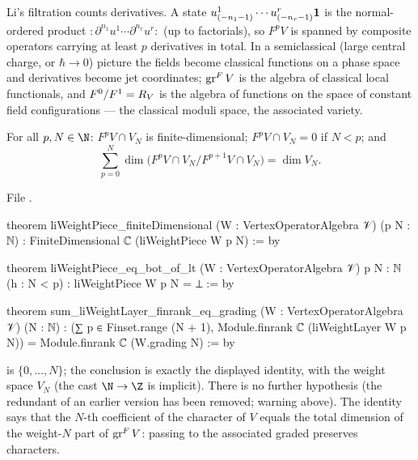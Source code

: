 \begin{physics}
Li's filtration counts derivatives. A state $u^1_{(-n_1-1)}\cdots u^r_{(-n_r-1)}\mathbf{1}$ is the
normal-ordered product ${:}\partial^{n_1}u^1\cdots\partial^{n_r}u^r{:}$ (up to factorials), so $F^pV$ is
spanned by composite operators carrying at least $p$ derivatives in total. In a semiclassical (large
central charge, or $\hbar\to0$) picture the fields become classical functions on a phase space and
derivatives become jet coordinates; $\operatorname{gr}^FV$ is the algebra of classical local functionals, and
$F^0/F^1 = R_V$ is the algebra of functions on the space of constant field configurations --- the
classical moduli space, the associated variety.
\end{physics}

\begin{theorem}\label{l11:thm:litele}
For all $p,N\in\N$: $F^pV\cap V_N$ is finite-dimensional; $F^pV\cap V_N = 0$ if $N<p$; and
\begin{equation*}
\sum_{p=0}^{N}\dim\bigl(F^pV\cap V_N\big/F^{p+1}V\cap V_N\bigr) = \dim V_N .
\end{equation*}
\end{theorem}
\noindent File .
\begin{leancode}
theorem liWeightPiece_finiteDimensional (W : VertexOperatorAlgebra 𝒱) (p N : ℕ) :
    FiniteDimensional ℂ (liWeightPiece W p N) := by

theorem liWeightPiece_eq_bot_of_lt (W : VertexOperatorAlgebra 𝒱) {p N : ℕ} (h : N < p) :
    liWeightPiece W p N = ⊥ := by

theorem sum_liWeightLayer_finrank_eq_grading (W : VertexOperatorAlgebra 𝒱) (N : ℕ) :
    (∑ p ∈ Finset.range (N + 1), Module.finrank ℂ (liWeightLayer W p N)) =
      Module.finrank ℂ (W.grading N) := by
\end{leancode}

\begin{dictionary}
 is $\{0,\dots,N\}$; the conclusion is exactly the displayed identity, with
 the weight space $V_N$ (the cast $\N\to\Z$ is implicit). There is no further hypothesis (the
redundant  of an earlier version has been removed; warning above). The identity says that the $N$-th coefficient of the character of $V$ equals
the total dimension of the weight-$N$ part of $\operatorname{gr}^FV$: passing to the associated graded preserves
characters.
\end{dictionary}

